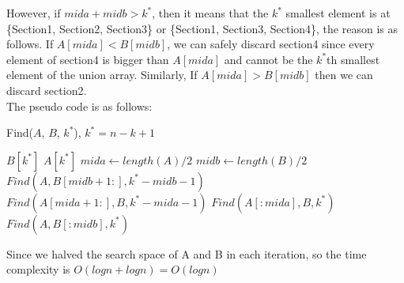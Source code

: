 However, if $mida + midb > k^{*}$, then it means that the $k^*$ smallest element is at \{Section1, Section2, Section3\} or \{Section1, Section3, Section4\}, the reason is as follows. If $A[mida] < B[midb]$, we can safely discard section4 since every element of section4 is bigger than $A[mida]$ and cannot be the $k^{*}$th smallest element of the union array. Similarly, If $A[mida] > B[midb]$ then we can discard section2.\\

The pseudo code is as follows:
\begin{algorithm}
\caption{Find($A$, $B$, $k^{*}$), $k^{*} = n - k + 1$}\label{euclid}
\begin{algorithmic}
 \Return $B[k^{*}]$
\EndIf
{} \Return $A[k^{*}]$
\EndIf
\State $mida \gets length(A)/2$
\State $midb \gets length(B)/2$
	  $Find(A, B[midb + 1:], k^{*} - midb - 1)$
	\Else  $Find(A[mida + 1:], B, k^{*} - mida - 1)$
	\EndIf
\Else 
	  $Find(A[:mida], B, k^{*})$
	\Else  $Find(A, B[:midb], k^{*})$
	\EndIf
\EndIf
\end{algorithmic}
\end{algorithm}

Since we halved the search space of A and B in each iteration, so the time complexity is $O(logn + logn) = O(logn)$